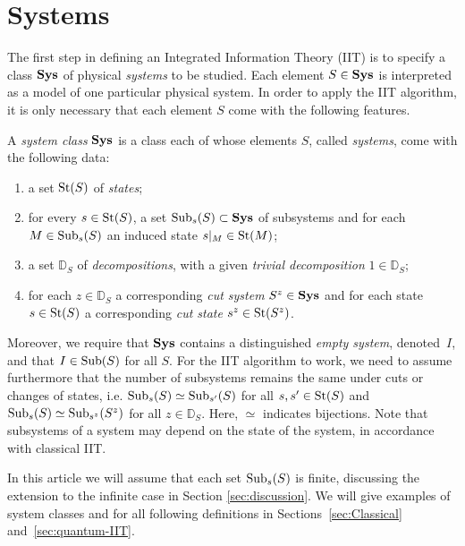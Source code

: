 \section{Systems} \label{sec:sys}

The first step in defining an Integrated Information Theory (IIT) is to specify a class $\mathbf{Sys}$ of physical \emph{systems} to be studied. Each element $S \in \mathbf{Sys}$ is interpreted as a model of one particular physical system. In order to apply the IIT algorithm, it is only necessary that each element $S$ come with the following features.

\begin{definition} \label{def:sys-class}
A \emph{system class} $\mathbf{Sys}$ is a class each of whose elements $S$, called \emph{systems}, come with the following data:
\begin{enumerate}[label=\arabic*.]
\item a set $\text{St}(S)$ of \emph{states};
\item for every $s \in \text{St}(S)$, a set $\mathrm{Sub}_s(S) \subset \mathbf{Sys}$ of subsystems and for each $M \in \mathrm{Sub}_s(S)$ an
induced state $s|_M \in \text{St}(M)$;
\item \label{it:Decomp} a set $\mathbb D_S$ of {\em decompositions}, with a given \emph{trivial decomposition} $1 \in \mathbb D_S$;
\item for each $z \in \mathbb D_S$ a corresponding \emph{cut system} ${S}^{z} \in \mathbf{Sys}$ and for each state $s \in \text{St}(S)$ a corresponding \emph{cut state} ${s}^{z} \in \text{St}({S}^{z})$.
\end{enumerate}
\end{definition}
Moreover, we require that $\mathbf{Sys}$ contains a distinguished \emph{empty system}, denoted~$I$, and that $I \in \mathrm{Sub}(S)$ for all $S$. For the IIT algorithm to work, we need to assume furthermore that the number of subsystems remains the same under cuts or changes of states,
i.e. $\mathrm{Sub}_s(S) \simeq \mathrm{Sub}_{s'}(S)$ for all $s, s' \in \text{St}(S)$ and $\mathrm{Sub}_s(S) \simeq \mathrm{Sub}_{{s}^{z}}({S}^{z})$ for all $z \in \mathbb D_S$. Here, $\simeq$ indicates bijections. Note that subsystems of a system may depend on the state of the system, in accordance with classical IIT. 

In this article we will assume that each set $\mathrm{Sub}_s(S)$ is finite, discussing the extension to the infinite case in Section \ref{sec:discussion}. We will give examples of system classes and for all following definitions in Sections~\ref{sec:Classical} and~\ref{sec:quantum-IIT}.



